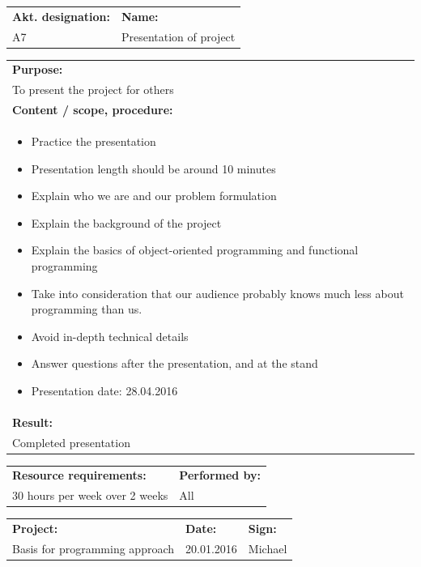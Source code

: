 \documentclass[12pt, a4paper]{article}
\begin{document}
\begin{tabularx}{\textwidth}{|p{40mm}|X|}
	\textbf{Akt. designation:}&\textbf{Name:}\\
	A7&Presentation of project  \\
	\hline
\end{tabularx}

\begin{tabularx}{\textwidth}{|X|}
	\textbf{Purpose:}\\
	To present the project for others\\
	\hline
	\textbf{Content / scope, procedure:}\\
	\begin{itemize}
		\item Practice the presentation
		\item Presentation length should be around 10 minutes
		\item Explain who we are and our problem formulation
		\item Explain the background of the project
		\item Explain the basics of object-oriented programming and functional programming
		\item Take into consideration that our audience probably knows much less about programming than us.
		\item Avoid in-depth technical details
		\item Answer questions after the presentation, and at the stand
		\item Presentation date: 28.04.2016

	\end{itemize}\\
 	\hline
	\textbf{Result:}\\
	Completed presentation \\
	\hline
\end{tabularx}

\begin{tabularx}{\textwidth}{|X|p{30mm}|}
	\textbf{Resource requirements:}&\textbf{Performed by:}\\
	30 hours per week over 2 weeks&All\\
	\hline
\end{tabularx}

\newpage

\begin{tabularx}{\textwidth}{|X|p{32mm}|p{20mm}|}
	\hline
	\textbf{Project:}&\textbf{Date:}&\textbf{Sign:}\\
	Basis for programming approach&20.01.2016&Michael\\
	\hline
\end{tabularx}
\end{document}
